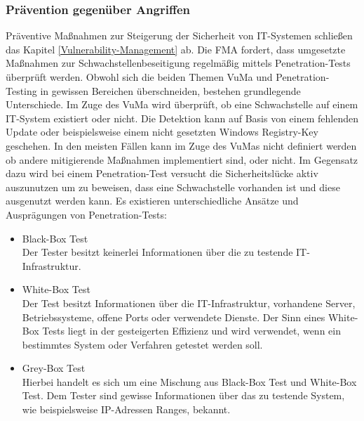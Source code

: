 \subsubsection{Prävention gegenüber Angriffen}
\label{ch:penetration-tests}
Präventive Maßnahmen zur Steigerung der Sicherheit von IT-Systemen schließen das Kapitel \ref{Vulnerability-Management} ab. 
Die FMA fordert, dass umgesetzte Maßnahmen zur Schwachstellenbeseitigung regelmäßig mittels Penetration-Tests überprüft werden. 
Obwohl sich die beiden Themen VuMa und Penetration-Testing in gewissen Bereichen überschneiden, bestehen grundlegende Unterschiede. Im Zuge des VuMa wird überprüft, ob eine Schwachstelle auf einem IT-System existiert oder nicht. Die Detektion kann auf Basis von einem fehlenden Update oder beispielsweise einem nicht gesetzten Windows Registry-Key geschehen. In den meisten Fällen kann im Zuge des VuMas nicht definiert werden ob andere mitigierende Maßnahmen implementiert sind, oder nicht. Im Gegensatz dazu wird bei einem Penetration-Test versucht die Sicherheitslücke aktiv auszunutzen um zu beweisen, dass eine Schwachstelle vorhanden ist und diese ausgenutzt werden kann. \autocite{HaberMoreyJ2018AAV:} 
\bigbreak
Es existieren unterschiedliche Ansätze und Ausprägungen von Penetration-Tests:
\begin{itemize}
    \item Black-Box Test\\
    Der Tester besitzt keinerlei Informationen über die zu testende IT-Infrastruktur. 
    \item White-Box Test\\
    Der Test besitzt Informationen über die IT-Infrastruktur, vorhandene Server, Betriebssysteme, offene Ports oder verwendete Dienste. Der Sinn eines White-Box Tests liegt in der gesteigerten Effizienz und wird verwendet, wenn ein bestimmtes System oder Verfahren getestet werden soll.
    \item Grey-Box Test\\
    Hierbei handelt es sich um eine Mischung aus Black-Box Test und White-Box Test. Dem Tester sind gewisse Informationen über das zu testende System, wie beispielsweise IP-Adressen Ranges, bekannt.
\end{itemize}
